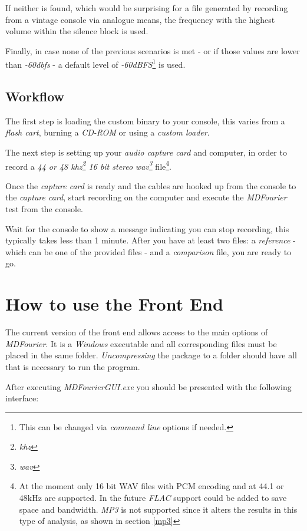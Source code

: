 \documentclass[10pt,a4paper]{report}
\newcommand{\define}[1] {
	\textit{\acrshort{#1}\footnote{\textit{\acrlong{#1}}}}}
\begin{document}
If neither is found, which would be surprising for a file generated by recording from a vintage console via analogue means, the frequency with the highest volume within the silence block is used. 

Finally, in case none of the previous scenarios is met - or if those values are lower than \textit{-60}\textit{dbfs} - a default level of \textit{-60dBFS}\footnote{This can be changed via \textit{command line} options if needed.} is used. 

\section{Workflow}

The first step is loading the custom binary to your console, this varies from a \textit{flash cart}, burning a \textit{CD-ROM} or using a \textit{custom loader}.

The next step is setting up your \textit{audio capture card} and computer, in order to record a \textit{44 or 48\define{khz} 16 bit stereo} \define{wav} file\footnote{At the moment only 16 bit WAV files with PCM encoding and at 44.1 or 48kHz are supported. In the future \textit{FLAC} support could be added to save space and bandwidth. \textit{MP3} is not supported since it alters the results in this type of analysis, as shown in section \ref{mp3}}.

Once the \textit{capture card} is ready and the cables are hooked up from the console to the \textit{capture card}, start recording on the computer and execute the \textit{MDFourier} test from the console.

Wait for the console to show a message indicating you can stop recording, this typically takes less than 1 minute. After you have at least two files: a \textit{reference} - which can be one of the provided files -  and a \textit{comparison} file, you are ready to go. 

\chapter{How to use the Front End}
\label{usinggui}
The current version of the front end allows access to the main options of \textit{MDFourier}. It is a \textit{Windows} executable and all corresponding files must be placed in the same folder. \textit{Uncompressing} the package to a folder should have all that is necessary to run the program.

After executing \textit{MDFourierGUI.exe} you should be presented with the following interface:
\end{document}
